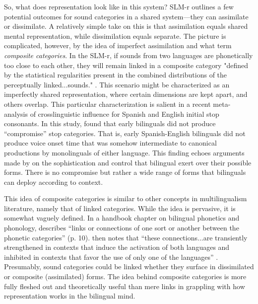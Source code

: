 So, what does representation look like in this system? SLM-r outlines a few potential outcomes for sound categories in a shared system—they can assimilate or dissimilate. A relatively simple take on this is that assimilation equals shared mental representation, while dissimilation equals separate. The picture is complicated, however, by the idea of imperfect assimilation and what \citeauthor{flege_2021_slmr} term \textit{composite categories}. In the SLM-r, if sounds from two languages are phonetically too close to each other, they will remain linked in a composite category "defined by the statistical regularities present in the combined distributions of the perceptually linked...sounds." \citep[][p. 41]{flege_2021_slmr}. This scenario might be characterized as an imperfectly shared representation, where certain dimensions are kept apart, and others overlap. This particular characterization is salient in a recent meta-analysis of crosslinguistic influence for Spanish and English initial stop consonants. In this study, \citet{casillas_2021_interlingual} found that early bilinguals did not produce ``compromise'' stop categories. That is, early Spanish-English bilinguals did not produce voice onset time that was somehow intermediate to canonical productions by monolinguals of either language. This finding echoes arguments made by \citet{bullock_2009_sociophonetics} on the sophistication and control that bilingual exert over their possible forms. There is no compromise but rather a wide range of forms that bilinguals can deploy according to context.


This idea of composite categories is similar to other concepts in multilingualism literature, namely that of linked categories. While the idea is pervasive, it is somewhat vaguely defined. In a handbook chapter on bilingual phonetics and phonology, \citet{simonet_2016_bilingualism} describes ``links or connections of one sort or another between the phonetic categories'' (p. 10). \citeauthor{simonet_2016_bilingualism} then notes that ``these connections...are transiently strengthened in contexts that induce the activation of both languages and inhibited in contexts that favor the use of only one of the languages'' \citeyearpar[][p. 10]{simonet_2016_bilingualism}. Presumably, sound categories could be linked whether they surface in dissimilated or composite (assimilated) forms. The idea behind composite categories is more fully fleshed out and theoretically useful than mere links in grappling with how representation works in the bilingual mind. 

